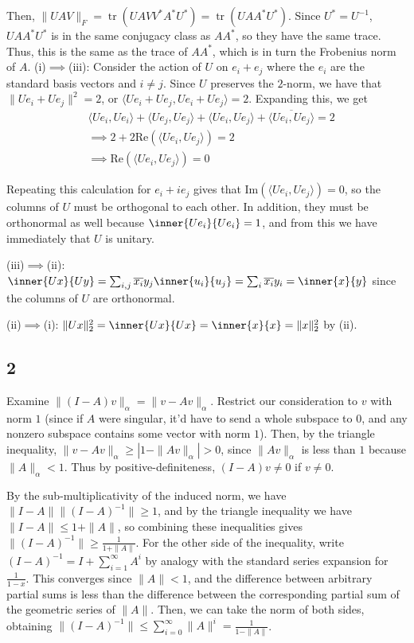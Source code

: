 \documentclass{article}
\newcommand{\conj}{\overline}
\DeclareMathOperator{\tr}{tr}
\begin{document}
Then, $\|UAV\|_F=\tr(UAVV^*A^*U^*)=\tr(UAA^*U^*)$. Since $U^*=U^{-1}$, $UAA^*U^*$ is in the same conjugacy class as $AA^*$, so they have the same trace. Thus, this is the same as the trace of $AA^*$, which is in turn the Frobenius norm of $A$.
(i)$\implies$(iii):
Consider the action of $U$ on $e_i+e_j$ where the $e_i$ are the standard basis vectors and $i\neq j$. Since $U$ preserves the $2$-norm, we have that $\|Ue_i+Ue_j\|^2=2$, or $\langle Ue_i+Ue_j,Ue_i+Ue_j\rangle=2$. Expanding this, we get 
\begin{align*}
    &\langle Ue_i,Ue_i\rangle+\langle Ue_j,Ue_j\rangle+\langle Ue_i,Ue_j\rangle+\conj{\langle Ue_i,Ue_j\rangle}=2\\
    &\implies2+2\text{Re}(\langle Ue_i,Ue_j\rangle)=2\\
    &\implies \text{Re}(\langle Ue_i,Ue_j\rangle)=0
\end{align*}

Repeating this calculation for $e_i+ie_j$ gives that $\text{Im}(\langle Ue_i,Ue_j\rangle)=0$, so the columns of $U$ must be orthogonal to each other. In addition, they must be orthonormal as well because $\inner{Ue_i}{Ue_i}=1$, and from this we have immediately that $U$ is unitary.

(iii)$\implies$(ii): $\inner{Ux}{Uy}=\sum_{i,j}\conj{x_i}y_j\inner{u_i}{u_j}=\sum_i\conj{x_i}y_i=\inner{x}{y}$ since the columns of $U$ are orthonormal.

(ii)$\implies$(i): $\|Ux\|_2^2=\inner{Ux}{Ux}=\inner{x}{x}=\|x\|_2^2$ by (ii).
\subsection*{2}
Examine $\|(I-A)v\|_\alpha=\|v-Av\|_\alpha$. Restrict our consideration to $v$ with norm $1$ (since if $A$ were singular, it'd have to send a whole subspace to $0$, and any nonzero subspace contains some vector with norm $1$). Then, by the triangle inequality, $\|v-Av\|_\alpha\geq\left|1-\|Av\|_\alpha\right|>0$, since $\|Av\|_\alpha$ is less than $1$ because $\|A\|_\alpha<1$. Thus by positive-definiteness, $(I-A)v\neq0$ if $v\neq0$.

By the sub-multiplicativity of the induced norm, we have $\|I-A\|\|(I-A)^{-1}\|\geq1$, and by the triangle inequality we have $\|I-A\|\leq1+\|A\|$, so combining these inequalities gives $\|(I-A)^{-1}\|\geq\frac{1}{1+\|A\|}$. For the other side of the inequality, write $(I-A)^{-1}=I+\sum_{i=1}^\infty A^i$ by analogy with the standard series expansion for $\frac{1}{1-x}$. This converges since $\|A\|<1$, and the difference between arbitrary partial sums is less than the difference between the corresponding partial sum of the geometric series of $\|A\|$. Then, we can take the norm of both sides, obtaining $\|(I-A)^{-1}\|\leq\sum_{i=0}^\infty\|A\|^i=\frac{1}{1-\|A\|}$.
\end{document}
